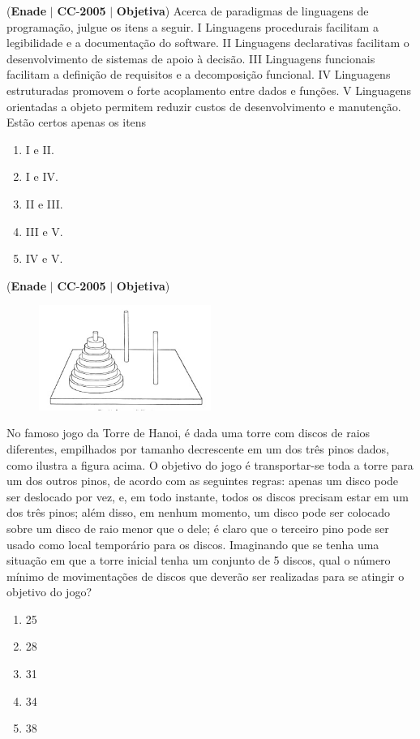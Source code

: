 \documentclass{exam}
\begin{document}
\begin{questions}
\question (\textbf{Enade} $|$ \textbf{CC}-\textbf{2005} $|$ \textbf{Objetiva})
Acerca de paradigmas de linguagens de programação, julgue
os itens a seguir.
I Linguagens procedurais facilitam a legibilidade e a
documentação do software.
II Linguagens declarativas facilitam o desenvolvimento de
sistemas de apoio à decisão.
III Linguagens funcionais facilitam a definição de requisitos
e a decomposição funcional.
IV Linguagens estruturadas promovem o forte acoplamento
entre dados e funções.
V Linguagens orientadas a objeto permitem reduzir custos de
desenvolvimento e manutenção.
Estão certos apenas os itens
	\begin{enumerate}[label=\alph*)]
		\item  I e II. 
		\item  I e IV. 
		\item  II e III.
		\item  III e V.
		\item  IV e V.
	\end{enumerate}

\question (\textbf{Enade} $|$ \textbf{CC}-\textbf{2005} $|$ \textbf{Objetiva})

\begin{figure}[H]
	\begin{center}
		\includegraphics[width=0.5\textwidth]{CIENCIA_DA_COMPUTACAO_Prova2005-utf8_figuras/fig-0018.jpg}
	\end{center}
\end{figure}
No famoso jogo da Torre de Hanoi, é dada uma torre
com discos de raios diferentes, empilhados por tamanho
decrescente em um dos três pinos dados, como ilustra a figura
acima. O objetivo do jogo é transportar-se toda a torre para
um dos outros pinos, de acordo com as seguintes regras:
apenas um disco pode ser deslocado por vez, e, em todo
instante, todos os discos precisam estar em um dos três pinos;
além disso, em nenhum momento, um disco pode ser colocado
sobre um disco de raio menor que o dele; é claro que o
terceiro pino pode ser usado como local temporário para os
discos.
Imaginando que se tenha uma situação em que a torre inicial tenha
um conjunto de 5 discos, qual o número mínimo de movimentações
de discos que deverão ser realizadas para se atingir o objetivo do
jogo?
	\begin{enumerate}[label=\alph*)]
		\item  25
		\item  28
		\item  31
		\item  34
		\item  38
	\end{enumerate}


\end{questions}
\end{document}
